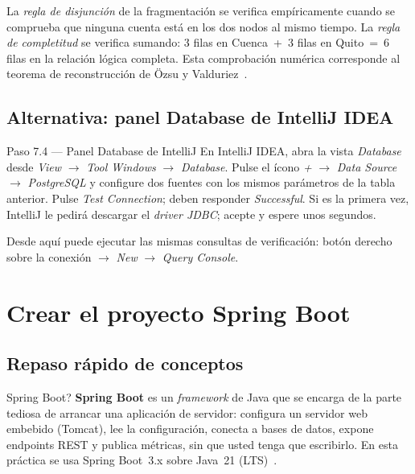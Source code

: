 \documentclass[11pt,a4paper]{article}
\begin{document}
\begin{verifbox}
La \emph{regla de disjunci\'on} de la fragmentaci\'on se verifica emp\'iricamente cuando se comprueba que ninguna cuenta est\'a en los dos nodos al mismo tiempo. La \emph{regla de completitud} se verifica sumando: 3 filas en Cuenca~+~3 filas en Quito~=~6 filas en la relaci\'on l\'ogica completa. Esta comprobaci\'on num\'erica corresponde al teorema de reconstrucci\'on de Özsu y Valduriez~\cite[cap.~3]{Ozsu2020Principles}.
\end{verifbox}

\subsection{Alternativa: panel Database de IntelliJ IDEA}

\begin{pasobox}{Paso 7.4 --- Panel Database de IntelliJ}
En IntelliJ IDEA, abra la vista \emph{Database} desde \emph{View} $\rightarrow$ \emph{Tool Windows} $\rightarrow$ \emph{Database}. Pulse el \'icono \emph{+} $\rightarrow$ \emph{Data Source} $\rightarrow$ \emph{PostgreSQL} y configure dos fuentes con los mismos par\'ametros de la tabla anterior. Pulse \emph{Test Connection}; deben responder \emph{Successful}. Si es la primera vez, IntelliJ le pedir\'a descargar el \emph{driver JDBC}; acepte y espere unos segundos.

Desde aqu\'i puede ejecutar las mismas consultas de verificaci\'on: bot\'on derecho sobre la conexi\'on $\rightarrow$ \emph{New} $\rightarrow$ \emph{Query Console}.
\end{pasobox}

\clearpage
\section{Crear el proyecto Spring Boot}

\subsection{Repaso r\'apido de conceptos}

\begin{conceptobox}{Spring Boot?}
\textbf{Spring Boot} es un \emph{framework} de Java que se encarga de la parte tediosa de arrancar una aplicaci\'on de servidor: configura un servidor web embebido (Tomcat), lee la configuraci\'on, conecta a bases de datos, expone endpoints REST y publica m\'etricas, sin que usted tenga que escribirlo. En esta pr\'actica se usa Spring Boot~3.x sobre Java~21 (LTS)~\cite{SpringBoot2024}.
\end{conceptobox}
\end{document}

